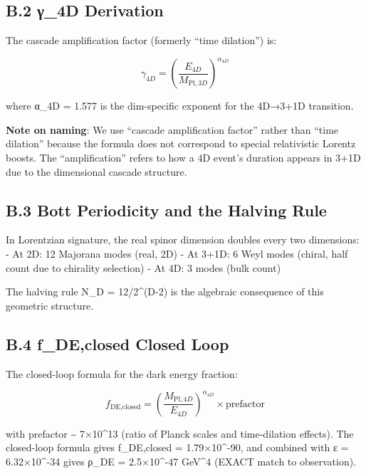 \hypertarget{b.2-ux3b3_4d-derivation}{%
\subsection{B.2 γ\_4D Derivation}\label{b.2-ux3b3_4d-derivation}}

The cascade amplification factor (formerly ``time dilation'') is:

\[\gamma_{4D} = \left(\frac{E_{4D}}{M_{\text{Pl},3D}}\right)^{\alpha_{4D}}\]

where α\_4D = 1.577 is the dim-specific exponent for the 4D→3+1D
transition.

\textbf{Note on naming}: We use ``cascade amplification factor'' rather
than ``time dilation'' because the formula does not correspond to
special relativistic Lorentz boosts. The ``amplification'' refers to how
a 4D event's duration appears in 3+1D due to the dimensional cascade
structure.

\hypertarget{b.3-bott-periodicity-and-the-halving-rule}{%
\subsection{B.3 Bott Periodicity and the Halving
Rule}\label{b.3-bott-periodicity-and-the-halving-rule}}

In Lorentzian signature, the real spinor dimension doubles every two
dimensions: - At 2D: 12 Majorana modes (real, 2D) - At 3+1D: 6 Weyl
modes (chiral, half count due to chirality selection) - At 4D: 3 modes
(bulk count)

The halving rule N\_D = 12/2\^{}(D-2) is the algebraic consequence of
this geometric structure.

\hypertarget{b.4-f_declosed-closed-loop}{%
\subsection{B.4 f\_DE,closed Closed
Loop}\label{b.4-f_declosed-closed-loop}}

The closed-loop formula for the dark energy fraction:

\[f_{\text{DE},\text{closed}} = \left(\frac{M_{\text{Pl},4D}}{E_{4D}}\right)^{\alpha_{4D}} \times \text{prefactor}\]

with prefactor \textasciitilde{} 7×10\^{}13 (ratio of Planck scales and
time-dilation effects). The closed-loop formula gives f\_DE,closed =
1.79×10\^{}-90, and combined with ε = 6.32×10\^{}-34 gives ρ\_DE =
2.5×10\^{}-47 GeV\^{}4 (EXACT match to observation).
